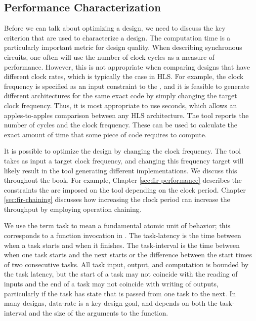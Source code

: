 \subsection{Performance Characterization}
\label{sec:designCharacterization}
Before we can talk about optimizing a design, we need to discuss the key criterion that are used to characterize a design.   The computation time is a particularly important metric for design quality.  When describing synchronous circuits, one often will use the number of clock cycles as a measure of performance.  However, this is not appropriate when comparing designs that have different clock rates, which is typically the case in HLS. For example, the clock frequency is specified as an input constraint to the \VHLS, and it is feasible to generate different architectures for the same exact code by simply changing the target clock frequency.  Thus, it is most appropriate to use seconds, which allows an apples-to-apples comparison between any HLS architecture. The \VHLS tool reports the number of cycles and the clock frequency. These can be used to calculate the exact amount of time that some piece of code requires to compute.

\begin{aside}
It is possible to optimize the design by changing the clock frequency. The \VHLS tool takes as input a target clock frequency, and changing this frequency target will likely result in the tool generating different implementations. We discuss this throughout the book. For example, Chapter \ref{sec:fir-performance} describes the constraints the are imposed on the \VHLS tool depending on the clock period. Chapter \ref{sec:fir-chaining} discusses how increasing the clock period can increase the throughput by employing operation chaining.
\end{aside}

We use the term \gls{task} to mean a fundamental atomic unit of behavior; this corresponds to a function invocation in \VHLS.  The \gls{task-latency} is the time between when a task starts and when it finishes.  The \gls{task-interval} is the time between when one task starts and the next starts or the difference between the start times of two consecutive tasks.  All task input, output, and computation is bounded by the task latency, but the start of a task may not coincide with the reading of inputs and the end of a task may not coincide with writing of outputs, particularly if the task has state that is passed from one task to the next.  In many designs, \gls{data-rate} is a key design goal, and depends on both the \gls{task-interval} and the size of the arguments to the function.

